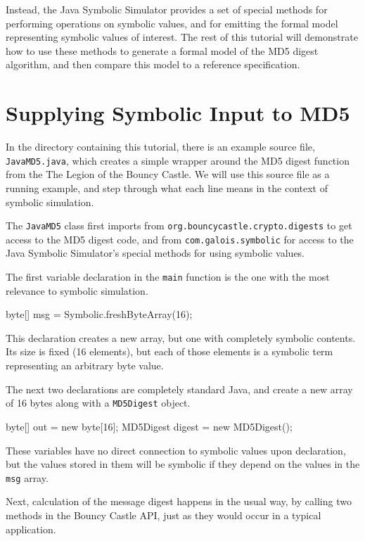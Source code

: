 \documentclass[11pt]{article}
\begin{document}
Instead, the Java Symbolic Simulator provides a set of special methods
for performing operations on symbolic values, and for emitting the
formal model representing symbolic values of interest. The rest of this
tutorial will demonstrate how to use these methods to generate a formal
model of the MD5 digest algorithm, and then compare this model to a
reference specification.

\section{Supplying Symbolic Input to MD5}

In the directory containing this tutorial, there is an example source
file, \texttt{JavaMD5.java}, which creates a simple wrapper around
the MD5 digest function from the The Legion of the Bouncy Castle.
We will use this source file as a running example, and step through
what each line means in the context of symbolic simulation.

The \texttt{JavaMD5} class first imports from
\texttt{org.bouncycastle.crypto.digests} to get access to the MD5
digest code, and from \texttt{com.galois.symbolic} for access to the
Java Symbolic Simulator's special methods for using symbolic values.

The first variable declaration in the \texttt{main} function is the
one with the most relevance to symbolic simulation.

\begin{code}
byte[] msg = Symbolic.freshByteArray(16);
\end{code}

This declaration creates a new array, but one with completely symbolic
contents. Its size is fixed (16 elements), but each of those elements
is a symbolic term representing an arbitrary byte value.

The next two declarations are completely standard Java, and create a
new array of 16 bytes along with a \texttt{MD5Digest} object.

\begin{code}
byte[] out = new byte[16];
MD5Digest digest = new MD5Digest();
\end{code}

These variables have no direct connection to symbolic values upon
declaration, but the values stored in them will be symbolic if they
depend on the values in the \texttt{msg} array.

Next, calculation of the message digest happens in the usual way, by
calling two methods in the Bouncy Castle API, just as they would occur
in a typical application.
\end{document}
